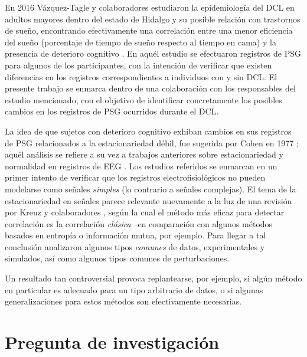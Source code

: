 En 2016 Vázquez-Tagle y colaboradores estudiaron la epidemiología del DCL en adultos mayores dentro 
del estado de Hidalgo y su posible relación con trastornos de sueño, encontrando efectivamente una 
correlación entre una menor eficiencia del sueño (porcentaje de tiempo de sueño respecto al tiempo 
en cama) y la presencia de deterioro cognitivo \cite{VazquezTagle16}.
%
En aquél estudio se efectuaron registros de PSG para algunos de los participantes, con la intención 
de verificar que existen diferencias en los registros correspondientes a individuos con y sin DCL.
%
El presente trabajo se enmarca dentro de una colaboración con los responsables del estudio 
mencionado, con el objetivo de identificar concretamente los posibles cambios en los registros de PSG 
ocurridos durante el DCL.

La idea de que sujetos con deterioro cognitivo exhiban cambios en sus registros de PSG relacionados 
a la estacionariedad débil, fue sugerida por Cohen en 1977 \cite{Cohen77}; aquél análisis se 
refiere a su vez a trabajos anteriores sobre estacionariedad y normalidad en registros de EEG
\cite{McEwen75,Sugimoto78,Kawabata73}.
%
Los estudios referidos se enmarcan en un primer intento de verificar que los registros 
electrofisiológicos no pueden modelarse como señales \textit{simples} (lo contrario a señales 
complejas).
%
El tema de la estacionariedad en señales parece relevante nuevamente a la luz de una revisión
por Kreuz y colaboradores \cite{Kreuz07}, según la cual el método más eficaz para detectar 
correlación es la correlación \textit{clásica} --en comparación con algunos métodos basados en 
entropía o información mutua, por ejemplo. 
%
Para llegar a tal conclusión analizaron algunos tipos \textit{comunes} de datos, experimentales y 
simulados, así como algunos tipos comunes de perturbaciones.

Un resultado tan controversial provoca replantearse, por ejemplo, si algún método en particular es 
adecuado para un tipo arbitrario de datos, o si algunas generalizaciones para estos métodos son 
efectivamente necesarias.


\section{Pregunta de investigación}


